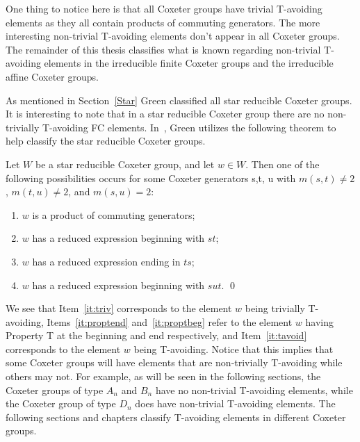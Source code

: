 One thing to notice here is that all Coxeter groups have trivial T-avoiding elements as they all contain products of commuting generators. The more interesting non-trivial T-avoiding elements don't appear in all Coxeter groups. The remainder of this thesis classifies what is known regarding non-trivial T-avoiding elements in the irreducible finite Coxeter groups and the irreducible affine Coxeter groups. 

As mentioned in Section~\ref{Star} Green classified all star reducible Coxeter groups. It is interesting to note that in a star reducible Coxeter group there are no non-trivially T-avoiding FC elements. In~\cite{Green2006a}, Green utilizes the following theorem to help classify the star reducible Coxeter groups. 
\begin{theorem}
	Let $W$ be a star reducible Coxeter group, and let $w \in W$. Then one of the following possibilities occurs for some Coxeter generators s,t, u with $m(s,t) \neq 2$, $m(t,u) \neq 2$, and $m(s,u)=2$:
	\begin{enumerate}
	\item $w$ is a product of commuting generators;\label{it:triv}
	\item $w$ has a reduced expression beginning with $st$;\label{it:proptend}
	\item $w$ has a reduced expression ending in $ts$;\label{it:proptbeg}
	\item $w$ has a reduced expression beginning with $sut$.\label{it:tavoid}	\qed
	\end{enumerate}
\end{theorem}

We see that Item~\ref{it:triv} corresponds to the element $w$ being trivially T-avoiding, Items~\ref{it:proptend} and~\ref{it:proptbeg} refer to the element $w$ having Property T at the beginning and end respectively, and Item~\ref{it:tavoid} corresponds to the element $w$ being T-avoiding. Notice that this implies that some Coxeter groups will have elements that are non-trivially T-avoiding while others may not. For example, as will be seen in the following sections, the Coxeter groups of type $A_n$ and $B_n$ have no non-trivial T-avoiding elements, while the Coxeter group of type $D_n$ does have non-trivial T-avoiding elements. The following sections and chapters classify T-avoiding elements in different Coxeter groups. 



